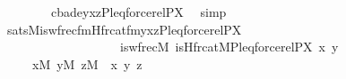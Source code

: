 \begin{isabellebody}
\ \ \ \ \ \ \ \ {\isachardoublequoteopen}{\isacharbrackleft}{\kern0pt}c{\isacharcomma}{\kern0pt}b{\isacharcomma}{\kern0pt}a{\isacharcomma}{\kern0pt}d{\isacharcomma}{\kern0pt}e{\isacharcomma}{\kern0pt}y{\isacharcomma}{\kern0pt}x{\isacharcomma}{\kern0pt}z{\isacharcomma}{\kern0pt}P{\isacharcomma}{\kern0pt}leq{\isacharcomma}{\kern0pt}forcerel{\isacharparenleft}{\kern0pt}P{\isacharcomma}{\kern0pt}X{\isacharparenright}{\kern0pt}{\isacharbrackright}{\kern0pt}{\isachardoublequoteclose}{\isacharbrackright}{\kern0pt}\ \isamarkupfalse%
\ simp\isanewline
\ \ \isamarkupfalse%
\ {}{\isacharcolon}{\kern0pt}{\isachardoublequoteopen}sats{\isacharparenleft}{\kern0pt}M{\isacharcomma}{\kern0pt}is{\isacharunderscore}{\kern0pt}wfrec{\isacharunderscore}{\kern0pt}fm{\isacharparenleft}{\kern0pt}Hfrc{\isacharunderscore}{\kern0pt}at{\isacharunderscore}{\kern0pt}fm{\isacharparenleft}{\kern0pt}{}{\isacharcomma}{\kern0pt}{}{\isacharcomma}{\kern0pt}{}{\isacharcomma}{\kern0pt}{}{\isacharcomma}{\kern0pt}{}{\isacharparenright}{\kern0pt}{\isacharcomma}{\kern0pt}{}{\isacharcomma}{\kern0pt}{}{\isacharcomma}{\kern0pt}{}{\isacharparenright}{\kern0pt}{\isacharcomma}{\kern0pt}{\isacharbrackleft}{\kern0pt}y{\isacharcomma}{\kern0pt}x{\isacharcomma}{\kern0pt}z{\isacharcomma}{\kern0pt}P{\isacharcomma}{\kern0pt}leq{\isacharcomma}{\kern0pt}forcerel{\isacharparenleft}{\kern0pt}P{\isacharcomma}{\kern0pt}X{\isacharparenright}{\kern0pt}{\isacharbrackright}{\kern0pt}{\isacharparenright}{\kern0pt}\ {\isasymlongleftrightarrow}\isanewline
\ \ \ \ \ \ \ \ \ \ \ \ \ \ \ \ \ \ \ is{\isacharunderscore}{\kern0pt}wfrec{\isacharparenleft}{\kern0pt}{\isacharhash}{\kern0pt}{\isacharhash}{\kern0pt}M{\isacharcomma}{\kern0pt}\ is{\isacharunderscore}{\kern0pt}Hfrc{\isacharunderscore}{\kern0pt}at{\isacharparenleft}{\kern0pt}{\isacharhash}{\kern0pt}{\isacharhash}{\kern0pt}M{\isacharcomma}{\kern0pt}P{\isacharcomma}{\kern0pt}leq{\isacharparenright}{\kern0pt}{\isacharcomma}{\kern0pt}forcerel{\isacharparenleft}{\kern0pt}P{\isacharcomma}{\kern0pt}X{\isacharparenright}{\kern0pt}{\isacharcomma}{\kern0pt}\ x{\isacharcomma}{\kern0pt}\ y{\isacharparenright}{\kern0pt}{\isachardoublequoteclose}\isanewline
\ \ \ \ \ {\isachardoublequoteopen}x{\isasymin}M{\isachardoublequoteclose}\ {\isachardoublequoteopen}y{\isasymin}M{\isachardoublequoteclose}\ {\isachardoublequoteopen}z{\isasymin}M{\isachardoublequoteclose}\ \ x\ y\ z\isanewline
\ \ \ \ \isamarkupfalse%

\end{isabellebody}
